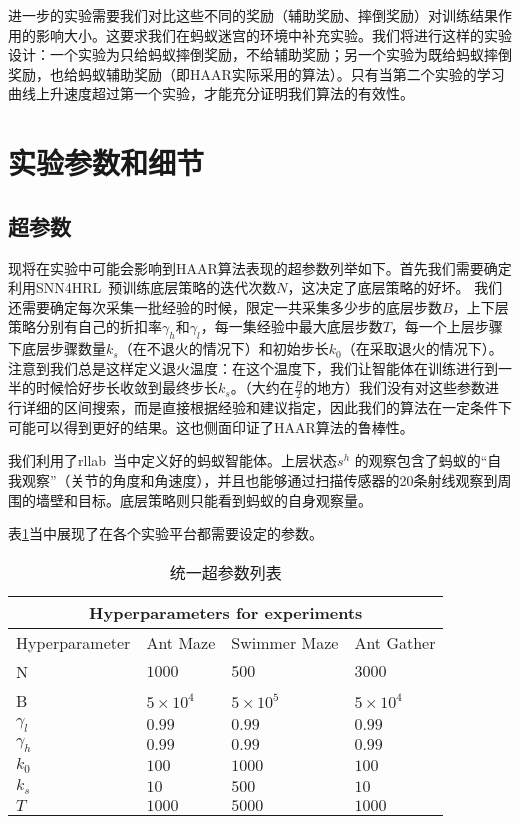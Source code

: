 进一步的实验需要我们对比这些不同的奖励（辅助奖励、摔倒奖励）对训练结果作用的影响大小。这要求我们在蚂蚁迷宫的环境中补充实验。我们将进行这样的实验设计：一个实验为只给蚂蚁摔倒奖励，不给辅助奖励；另一个实验为既给蚂蚁摔倒奖励，也给蚂蚁辅助奖励（即HAAR实际采用的算法）。只有当第二个实验的学习曲线上升速度超过第一个实验，才能充分证明我们算法的有效性。

\section{实验参数和细节}\label{params}
\subsection{超参数}
现将在实验中可能会影响到HAAR算法表现的超参数列举如下。首先我们需要确定利用SNN4HRL~\cite{SNN4hrl}预训练底层策略的迭代次数$N$，这决定了底层策略的好坏。 我们还需要确定每次采集一批经验的时候，限定一共采集多少步的底层步数$B$，上下层策略分别有自己的折扣率$\gamma_h$和$\gamma_l$，每一集经验中最大底层步数$T$，每一个上层步骤下底层步骤数量$k_s$（在不退火的情况下）和初始步长$k_0$（在采取退火的情况下）。注意到我们总是这样定义退火温度：在这个温度下，我们让智能体在训练进行到一半的时候恰好步长收敛到最终步长$k_s$。（大约在$\frac{B}{2}$的地方）我们没有对这些参数进行详细的区间搜索，而是直接根据经验和建议指定，因此我们的算法在一定条件下可能可以得到更好的结果。这也侧面印证了HAAR算法的鲁棒性。

我们利用了rllab~\cite{benchmarking_RL}当中定义好的蚂蚁智能体。上层状态$s^h$ 的观察包含了蚂蚁的``自我观察''（关节的角度和角速度），并且也能够通过扫描传感器的20条射线观察到周围的墙壁和目标。底层策略则只能看到蚂蚁的自身观察量。

表\ref{table:hyperparamters}当中展现了在各个实验平台都需要设定的参数。

\begin{table}
\caption{统一超参数列表}
\begin{tabular}[c]{ |p{3cm}||p{3cm}|p{3cm}|p{3cm}|  }
 \hline 
 \multicolumn{4}{|c|}{Hyperparameters for experiments} \\
 \hline
 Hyperparameter & Ant Maze & Swimmer Maze & Ant Gather \\
 \hline
 N  & $1000$ & $500$ & $3000$\\
 B  & $5\times 10^4$ & $5\times10^5$  & $5\times10^4$ \\
 $\gamma_l$ & $0.99$ & $0.99$ & $0.99$\\
 $\gamma_h$ & $0.99$ & $0.99$ & $0.99$\\
 $k_0$ & $100$  & $1000$ & $100$\\
 $k_s$ & $10$  & $500$  & $10$\\
 $T$ & $1000$  & $5000$ & $1000$\\
 \hline
\end{tabular}
\label{table:hyperparamters}
\end{table}

